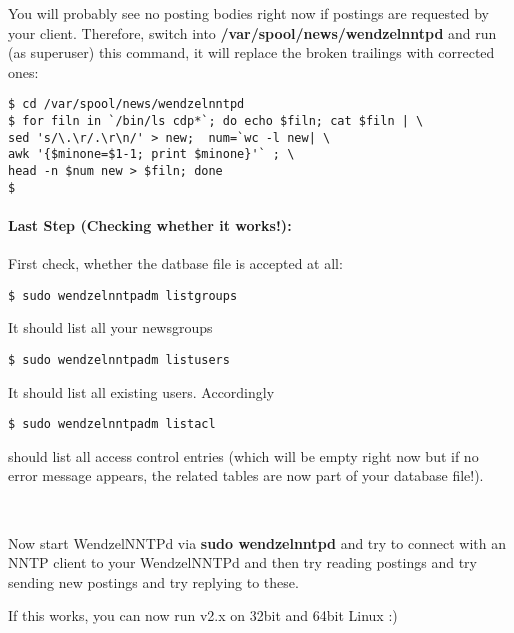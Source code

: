 You will probably see no posting bodies right now if postings are requested by your client. Therefore, switch into {\bf /var/spool/news/wendzelnntpd} and run (as superuser) this command, it will replace the broken trailings with corrected ones:

\begin{verbatim}
$ cd /var/spool/news/wendzelnntpd 
$ for filn in `/bin/ls cdp*`; do echo $filn; cat $filn | \
sed 's/\.\r/.\r\n/' > new;  num=`wc -l new| \
awk '{$minone=$1-1; print $minone}'` ; \
head -n $num new > $filn; done
$
\end{verbatim}

\paragraph*{Last Step (Checking whether it works!):}

First check, whether the datbase file is accepted at all:

\begin{verbatim}
$ sudo wendzelnntpadm listgroups
\end{verbatim}

It should list all your newsgroups

\begin{verbatim}
$ sudo wendzelnntpadm listusers
\end{verbatim}

It should list all existing users. Accordingly

\begin{verbatim}
$ sudo wendzelnntpadm listacl
\end{verbatim}

should list all access control entries (which will be empty right now but if no error message appears, the related tables are now part of your database file!).

~

Now start WendzelNNTPd via {\bf sudo wendzelnntpd} and try to connect with an NNTP client to your WendzelNNTPd and then try reading postings and try sending new postings and try replying to these.

If this works, you can now run v2.x on 32bit and 64bit Linux :)


